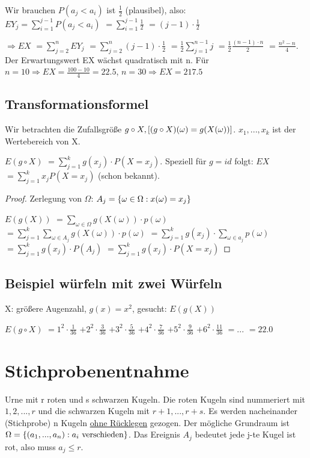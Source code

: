 Wir brauchen $P(a_j < a_i)$ ist $\frac{1}{2}$ (plausibel), also:\\

$ E Y_j = \sum_{i=1}^{j-1} P(a_j < a_i)$
$= \sum_{i=1}^{j-1} \frac{1}{2} $
$= (j-1) \cdot \frac{1}{2}$

$\Rightarrow E X $
$=\sum_{j=2}^{n} E Y_j $
$= \sum_{j=2}^{n} (j-1) \cdot \frac{1}{2}$
$=\frac{1}{2} \sum_{j=1}^{n-1} j $
$= \frac{1}{2} \frac{(n-1) \cdot n}{2}$
$= \frac{n^2 - n}{4}$. 
Der Erwartungswert EX wächst quadratisch mit n. Für $n=10 \Rightarrow EX=\frac{100-10}{4} = 22.5$, 
$n=30 \Rightarrow EX = 217.5$

\subsection{Transformationsformel}
Wir betrachten die Zufallsgröße $g\circ X,  \left[ (g\circ X)(\omega) = g(X(\omega)) \right] $. 
$x_1, ..., x_k$ ist der Wertebereich von X.

$E(g\circ X) $
$=\sum_{j=1}^{k} g(x_j) \cdot P(X=x_j)$. Speziell für $g=id$ folgt: 
$ EX$
$= \sum_{j=1}^{k} x_j P(X=x_j)$ (schon bekannt).

\begin{proof}
Zerlegung von $\Omega$: $A_j =  \left\lbrace \omega \in \Omega: x(\omega) = x_j \right\rbrace $

$E(g(X)) $
$= \sum_{\omega \in \Omega} g(X(\omega)) \cdot p(\omega)$
$= \sum_{j=1}^{k} \sum_{\omega \in A_j} g(X(\omega)) \cdot p(\omega)$
$=\sum_{j=1}^{k} g(x_j) \cdot \sum_{\omega \in a_j} p(\omega)$
$=\sum_{j=1}^{k} g(x_j) \cdot P(A_j)$
$= \sum_{j=1}^{k} g(x_j) \cdot P(X=x_j)$
\end{proof}

\subsection{Beispiel würfeln mit zwei Würfeln}
X: größere Augenzahl, $g(x) = x^2$, gesucht: $E(g(X))$

$E(g\circ X)$
$=1^2 \cdot \frac{1}{36} $
$+ 2^2 \cdot \frac{3}{36} $
$+ 3^2 \cdot \frac{5}{36} $
$+ 4^2 \cdot \frac{7}{36} $
$+ 5^2 \cdot \frac{9}{36} $
$+ 6^2 \cdot \frac{11}{36} $
$= ... $
$=22.0$

\section{Stichprobenentnahme}
Urne mit r roten und s schwarzen Kugeln. Die roten Kugeln sind nummeriert mit $1,2,...,r$ und die schwarzen Kugeln mit $r+1,...,r+s$. Es werden nacheinander (Stichprobe) n Kugeln \underline{ohne Rücklegen} gezogen. Der mögliche Grundraum ist 
$\Omega =  \left\lbrace (a_1,...,a_n) : a_i \textrm{ verschieden} \right\rbrace $. Das Ereignis $A_j$ bedeutet jede j-te Kugel ist rot, also muss $a_j \leq r$.\\

